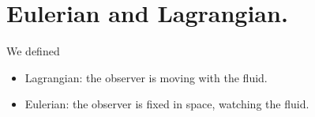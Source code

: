 \section{Eulerian and Lagrangian.}

We defined

\begin{itemize}
\item Lagrangian: the observer is moving with the fluid.
\item Eulerian: the observer is fixed in space, watching the fluid.
\end{itemize}
